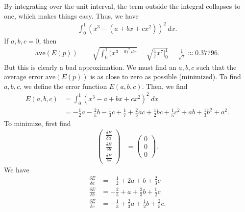 \documentclass{report}
\begin{document}
\begin{itemize}
            By integrating over the unit interval, the term outside the integral collapses to one, which makes things easy. Thus, we have
            \begin{align*}
                \int_0^{1} (x^{3} - (a+bx + cx^{2}))^{2}\ dx
            .\end{align*}
            \bigbreak \noindent 
            If $a,b,c  = 0$, then 
            \begin{align*}
                \text{ave}(E(p)) &= \sqrt{\int_0^{1} (x^{3 - 0)^{2} \ dx}} = \sqrt{ \frac{1}{7}x^{7}\bigg|_0^{1}} =\frac{1}{\sqrt{7}} \approx 0.37796
            .\end{align*}
            But this is clearly a bad approximation. We must find an $a,b,c$ such that the average error $\text{ave}(E(p))$ is as close to zero as possible (minimized).
            \bigbreak \noindent 
            To find $a,b,c$, we define the error function $E(a,b,c)$. Then, we find
            \begin{align*}
                E(a,b,c) &= \int_0^{1}(x^{3} - a + bx + cx^{2})^{2} \ dx \\
                         &=-\frac{1}{2}a -\frac{2}{5}b -\frac{1}{3}c + \frac{1}{7} +\frac{2}{3}ac  +\frac{1}{2}bc  +\frac{1}{5}c^{2} + ab + \frac{1}{3}b^{2} + a^{2}
            .\end{align*}
            To minimize, first find
            \begin{align*}
                \begin{pmatrix}
                    \frac{\delta E}{\delta a} \\ \frac{\delta E}{\delta b} \\ \frac{\delta  E}{\delta c} 
                \end{pmatrix}
                &= \begin{pmatrix}
                    0 \\ 0 \\ 0 
                \end{pmatrix}
            .\end{align*}
            We have
            \begin{align*}
                \frac{\delta E}{\delta a} &= -\frac{1}{2} + 2a + b + \frac{2}{3}c\\
                \frac{\delta E}{\delta b} &= -\frac{2}{5} + a + \frac{2}{3}b + \frac{1}{2}c\\
                \frac{\delta E}{\delta c} &= -\frac{1}{3} + \frac{2}{3}a + \frac{1}{2}b + \frac{2}{5}c
            .\end{align*}

\end{itemize}
\end{document}
